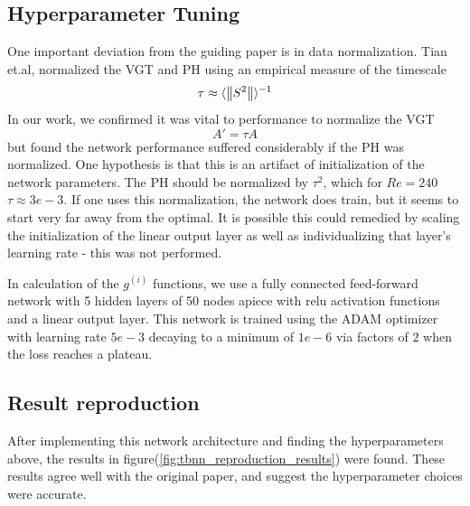 \subsection{Hyperparameter Tuning}
One important deviation from the guiding paper is in data normalization. Tian et.al, normalized the VGT and PH using an empirical measure of the timescale
\begin{equation}
    \tau \approx \langle \left\lVert S^2\right\rVert \rangle^{-1}
\end{equation}
In our work, we confirmed it was vital to performance to normalize the VGT
\begin{equation}
    A' = \tau A
\end{equation}
but found the network performance suffered considerably if the PH was normalized. One hypothesis is that this is an artifact of initialization of the network parameters. The PH should be normalized by $\tau^2$, which for $Re=240$ $\tau \approx 3e-3$. If one uses this normalization, the network does train, but it seems to start very far away from the optimal. It is possible this could remedied by scaling the initialization of the linear output layer as well as individualizing that layer's learning rate - this was not performed.

In calculation of the $g^{(i)}$ functions, we use a fully connected feed-forward network with 5 hidden layers of 50 nodes apiece with relu activation functions and a linear output layer. This network is trained using the ADAM optimizer with learning rate $5e-3$ decaying to a minimum of $1e-6$ via factors of $2$ when the loss reaches a plateau. 

\subsection{Result reproduction}
After implementing this network architecture and finding the hyperparameters above, the results in figure(\ref{fig:tbnn_reproduction_results}) were found. These results agree well with the original paper, and suggest the hyperparameter choices were accurate.

